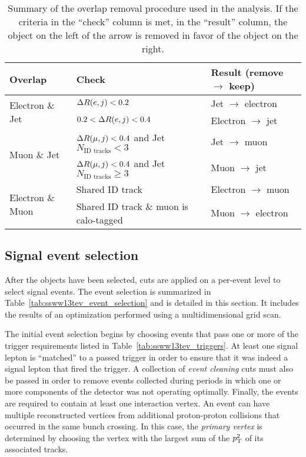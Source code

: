 \begin{table}[htbp]
  \centering
  \begin{tabular}{l l l}
    Overlap         & Check & Result (remove $\rightarrow$ keep) \\
    \hline\hline
    \multirow{2}{*}{Electron \& Jet}  & $\Delta R(e,j) < 0.2$       & Jet $\rightarrow$ electron \\
                                      & $0.2 < \Delta R(e,j) < 0.4$ & Electron $\rightarrow$ jet \\
    \hline
    \multirow{2}{*}{Muon \& Jet}      & $\Delta R(\mu,j) < 0.4$ and Jet $N_{\textrm{ID\ tracks}} < 3$
                                                                   & Jet $\rightarrow$ muon \\
                                      & $\Delta R(\mu,j) < 0.4$ and Jet $N_{\textrm{ID\ tracks}} \ge 3$
                                                                   & Muon $\rightarrow$ jet \\
    \hline
    \multirow{2}{*}{Electron \& Muon} & Shared ID track            & Electron $\rightarrow$ muon \\
                                      & Shared ID track \& muon is calo-tagged
                                                                   & Muon $\rightarrow$ electron \\
    \hline
  \end{tabular}
  \caption{Summary of the overlap removal procedure used in the analysis.  If the criteria in the ``check'' column is met, in the ``result'' column, the object on the left of the arrow is removed in favor of the object on the right.}
  \label{tab:ssww13tev_or}
\end{table}

\subsection{Signal event selection}\label{ssww13tev:event_selection}
After the objects have been selected, cuts are applied on a per-event level to select \ssww signal events.
The event selection is summarized in Table~\ref{tab:ssww13tev_event_selection} and is detailed in this section.
It includes the results of an optimization performed using a multidimensional grid scan.

The initial event selection begins by choosing events that pass one or more of the trigger requirements listed in Table~\ref{tab:ssww13tev_triggers}.
At least one signal lepton is ``matched'' to a passed trigger in order to ensure that it was indeed a signal lepton that fired the trigger.
A collection of \emph{event cleaning} cuts must also be passed in order to remove events collected during periods in which one or more components of the detector was not operating optimally.
Finally, the events are required to contain at least one interaction vertex.
An event can have multiple reconstructed vertices from additional proton-proton collisions that occurred in the same bunch crossing.
In this case, the \emph{primary vertex} is determined by choosing the vertex with the largest sum of the $p_{\mathrm{T}}^2$ of its associated tracks.

